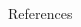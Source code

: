 \documentclass[final,t]{beamer}
\begin{document}
\begin{frame}{}
\begin{columns}[T]
\begin{column}{.31\linewidth}
	\begin{block}{References}
		\renewcommand*{\bibfont}{\scriptsize}
		\printbibliography
	\end{block}
\end{column}

\end{columns}
\end{frame}
\end{document}

